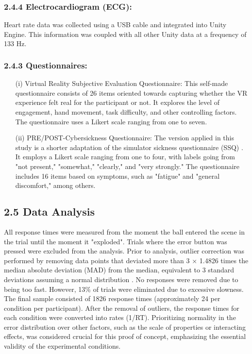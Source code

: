 \documentclass[12pt,oneside,openright]{report}
\begin{document}
\subsubsection*{2.4.4 Electrocardiogram (ECG):}

Heart rate data was collected using a USB cable and integrated into Unity Engine. This information was coupled with all other Unity data at a frequency of 133 Hz.

\subsubsection*{2.4.3 Questionnaires:}

\begin{enumerate}
\item[(i)] Virtual Reality Subjective Evaluation Questionnaire: This self-made questionnaire consists of 26 items oriented towards capturing whether the VR experience felt real for the participant or not. It explores the level of engagement, hand movement, task difficulty, and other controlling factors. The questionnaire uses a Likert scale ranging from one to seven.
\item[(ii)] PRE/POST-Cybersickness Questionnaire: The version applied in this study is a shorter adaptation of the simulator sickness questionnaire (SSQ) \parencite*{avpsy}. It employs a Likert scale ranging from one to four, with labels going from "not present," "somewhat," "clearly," and "very strongly." The questionnaire includes 16 items based on symptoms, such as "fatigue" and "general discomfort," among others.
\end{enumerate}

\subsection*{2.5 Data Analysis}

All response times were measured from the moment the ball entered the scene in the trial until the moment it "exploded". Trials where the error button was pressed were excluded from the analysis. Prior to analysis, outlier correction was performed by removing data points that deviated more than 3 × 1.4826 times the median absolute deviation (MAD) from the median, equivalent to 3 standard deviations assuming a normal distribution \parencite{Innes2019ACA}. No responses were removed due to being too fast. However, 13\% of trials were eliminated due to excessive slowness. The final sample consisted of 1826 response times (approximately 24 per condition per participant). After the removal of outliers, the response times for each condition were converted into rates (1/RT). Prioritizing normality in the error distribution over other factors, such as the scale of properties or interacting effects, was considered crucial for this proof of concept, emphasizing the essential validity of the experimental conditions. 
\end{document}
